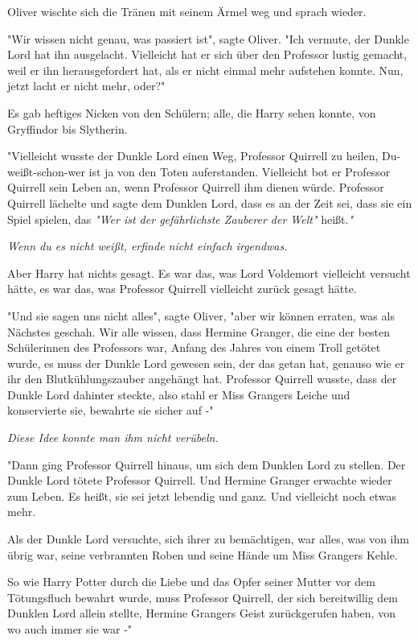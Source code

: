 {Oliver wischte sich die Tränen mit seinem Ärmel weg und sprach wieder.

"Wir wissen nicht genau, was passiert ist", sagte Oliver. "Ich vermute, der Dunkle Lord hat ihn ausgelacht. Vielleicht hat er sich über den Professor lustig gemacht, weil er ihn herausgefordert hat, als er nicht einmal mehr aufstehen konnte. Nun, jetzt lacht er nicht mehr, oder?"

Es gab heftiges Nicken von den Schülern; alle, die Harry sehen konnte, von Gryffindor bis Slytherin.

"Vielleicht wusste der Dunkle Lord einen Weg, Professor Quirrell zu heilen, Du-weißt-schon-wer ist ja von den Toten auferstanden. Vielleicht bot er Professor Quirrell sein Leben an, wenn Professor Quirrell ihm dienen würde. Professor Quirrell lächelte und sagte dem Dunklen Lord, dass es an der Zeit sei, dass sie ein Spiel spielen, das \emph{"Wer ist der gefährlichste Zauberer der Welt"} heißt.\emph{"}

\emph{Wenn du es nicht weißt, erfinde nicht einfach irgendwas.}

Aber Harry hat nichts gesagt. Es war das, was Lord Voldemort vielleicht versucht hätte, es war das, was Professor Quirrell vielleicht zurück gesagt hätte.

"Und sie sagen uns nicht alles", sagte Oliver, "aber wir können erraten, was als Nächstes geschah. Wir alle wissen, dass Hermine Granger, die eine der besten Schülerinnen des Professors war, Anfang des Jahres von einem Troll getötet wurde, es muss der Dunkle Lord gewesen sein, der das getan hat, genauso wie er ihr den Blutkühlungszauber angehängt hat. Professor Quirrell wusste, dass der Dunkle Lord dahinter steckte, also stahl er Miss Grangers Leiche und konservierte sie, bewahrte sie sicher auf -"

\emph{Diese Idee konnte man ihm nicht verübeln.}

"Dann ging Professor Quirrell hinaus, um sich dem Dunklen Lord zu stellen. Der Dunkle Lord tötete Professor Quirrell. Und Hermine Granger erwachte wieder zum Leben. Es heißt, sie sei jetzt lebendig und ganz. Und vielleicht noch etwas mehr.

Als der Dunkle Lord versuchte, sich ihrer zu bemächtigen, war alles, was von ihm übrig war, seine verbrannten Roben und seine Hände um Miss Grangers Kehle.

So wie Harry Potter durch die Liebe und das Opfer seiner Mutter vor dem Tötungsfluch bewahrt wurde, muss Professor Quirrell, der sich bereitwillig dem Dunklen Lord allein stellte, Hermine Grangers Geist zurückgerufen haben, von wo auch immer sie war -"

}
